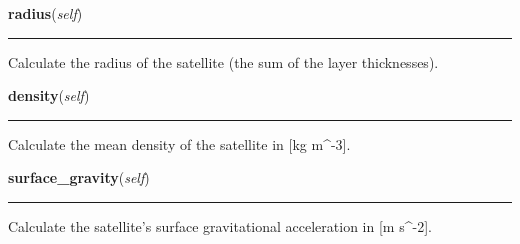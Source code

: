     \vspace{0.5ex}

\hspace{.8\funcindent}\begin{boxedminipage}{\funcwidth}

    \raggedright \textbf{radius}(\textit{self})

    \vspace{-1.5ex}

    \rule{\textwidth}{0.5\fboxrule}
\setlength{\parskip}{2ex}
    Calculate the radius of the satellite (the sum of the layer 
    thicknesses).

\setlength{\parskip}{1ex}
    \end{boxedminipage}

    \label{satstress:SatStress:Satellite:density}

    \vspace{0.5ex}

\hspace{.8\funcindent}\begin{boxedminipage}{\funcwidth}

    \raggedright \textbf{density}(\textit{self})

    \vspace{-1.5ex}

    \rule{\textwidth}{0.5\fboxrule}
\setlength{\parskip}{2ex}
    Calculate the mean density of the satellite in [kg 
    m{\textasciicircum}-3].

\setlength{\parskip}{1ex}
    \end{boxedminipage}

    \label{satstress:SatStress:Satellite:surface_gravity}

    \vspace{0.5ex}

\hspace{.8\funcindent}\begin{boxedminipage}{\funcwidth}

    \raggedright \textbf{surface\_gravity}(\textit{self})

    \vspace{-1.5ex}

    \rule{\textwidth}{0.5\fboxrule}
\setlength{\parskip}{2ex}
    Calculate the satellite's surface gravitational acceleration in [m 
    s{\textasciicircum}-2].

\setlength{\parskip}{1ex}
    \end{boxedminipage}

